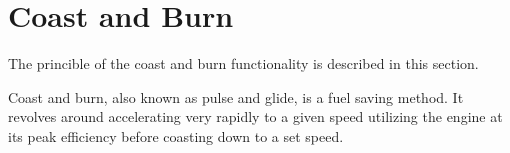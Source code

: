 \section{Coast and Burn}
The princible of the coast and burn functionality is described in this section.

Coast and burn, also known as pulse and glide, is a fuel saving method. It revolves around accelerating very rapidly to a given speed utilizing the engine at its peak efficiency before coasting down to a set speed. 
